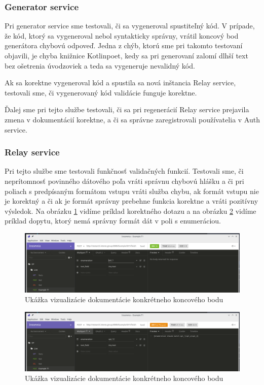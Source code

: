 \subsubsection{Generator service}
Pri generator service sme testovali, či sa vygeneroval spustiteľný kód. V prípade, že kód, ktorý sa vygeneroval nebol syntakticky správny, vrátil koncový bod generátora chybovú odpoveď. Jedna z chýb, ktorú sme pri takomto testovaní objavili, je chyba knižnice Kotlinpoet, kedy sa pri generovaní zalomí dlhší text bez ošetrenia úvodzoviek a teda sa vygeneruje nevalidný kód.

Ak sa korektne vygeneroval kód a spustila sa nová inštancia Relay service, testovali sme, či vygenerovaný kód validácie funguje korektne.

Ďalej sme pri tejto službe testovali, či sa pri regenerácií Relay service prejavila zmena v dokumentácií korektne, a či sa správne zaregistrovali používatelia v Auth service.

\subsubsection{Relay service}
Pri tejto službe sme testovali funkčnosť validačných funkcií.
 Testovali sme, či neprítomnosť povinného dátového poľa vráti správnu chybovú hlášku a či pri poliach s predpísaným formátom vstupu vráti služba chybu, ak formát vstupu nie je korektný a či ak je formát správny prebehne funkcia korektne a vráti pozitívny výsledok. 
 Na obrázku \ref{insomnia_200} vidíme príklad korektného dotazu a na obrázku \ref{insomnia_400} vidíme príklad dopytu, ktorý nemá správny formát dát v poli s enumeráciou.

\begin{figure}[!htbp]
	\centering
	\includegraphics[width=16cm]{img/insomnia_200.png}
    \caption{Ukážka vizualizácie dokumentácie konkrétneho koncového bodu}
	\label{insomnia_200}
\end{figure}

\begin{figure}[!htbp]
	\centering
	\includegraphics[width=16cm]{img/insomnia_400.png}
    \caption{Ukážka vizualizácie dokumentácie konkrétneho koncového bodu}
	\label{insomnia_400}
\end{figure}

